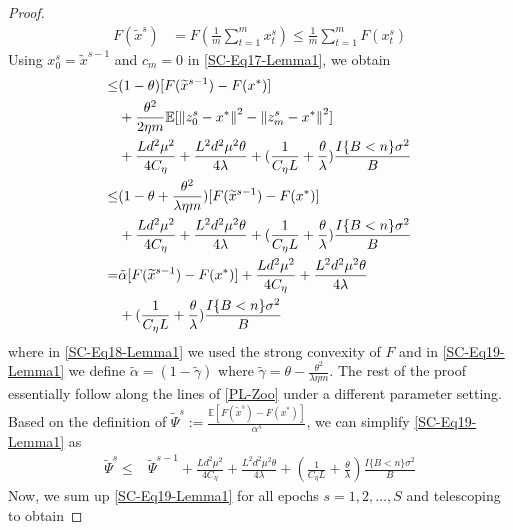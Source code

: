 \documentclass{article}
\newcommand*{\E}{\mathbb{E}}
\newcommand{\norm}[1]{\left\lVert#1\right\rVert}
\theoremstyle{definition}
\theoremstyle{remark}
\begin{document}
{{\begin{proof}
\begin{equation}
\begin{split}
F(\widetilde{x}^s) &= F(\frac{1}{m}\sum_{t=1}^{m} x_{t}^s)\leq \frac{1}{m}\sum_{t=1}^{m}F(x_{t}^s)
\end{split}
\end{equation}
Using $x_0^s = \widetilde{x}^{s-1}$ and $c_m=0$ in \eqref{SC-Eq17-Lemma1}, we obtain
\begin{align}
[F(\widetilde{x}^{s})-F(x^*)] \leq &(1-\theta)[F(\widetilde{x}^{s-1})-F(x^*)]\notag \\
&+ {\frac{ \theta^2}{2\eta m}}\E[\norm{z_{0}^s-x^*}^2-\norm{z_{m}^s-x^*}^2]\notag\\
&+\frac{Ld^2\mu^2}{4C_{\eta}}+\frac{ L^2d^2\mu^2\theta}{4\lambda}+(\frac{1}{C_{\eta} L}+\frac{\theta}{\lambda})\frac{I\{B < n\} \sigma ^2}{B}\notag\\
\leq&(1-\theta+\frac{ \theta^2}{\lambda\eta m})[F(\widetilde{x}^{s-1})-F(x^*)] \notag\\
&+\frac{Ld^2\mu^2}{4C_{\eta}}+\frac{ L^2d^2\mu^2\theta}{4\lambda}+(\frac{1}{C_{\eta} L}+\frac{\theta}{\lambda})\frac{I\{B < n\} \sigma ^2}{B}\label{SC-Eq18-Lemma1}\\
=&\tilde{\alpha}[F(\widetilde{x}^{s-1})-F(x^*)] +\frac{Ld^2\mu^2}{4C_{\eta}}+\frac{ L^2d^2\mu^2\theta}{4\lambda}\notag\\
&+(\frac{1}{C_{\eta} L}+\frac{\theta}{\lambda})\frac{I\{B < n\} \sigma ^2}{B}\label{SC-Eq19-Lemma1}
\end{align}
where in \eqref{SC-Eq18-Lemma1} we used the strong convexity of $F$ and in \eqref{SC-Eq19-Lemma1} we define $\tilde{\alpha} = (1-\widetilde{\gamma})$ where $\widetilde{\gamma}  = \theta - \frac{ \theta^2}{\lambda\eta m}$. The rest of the proof essentially follow along the lines of \ref{PL-Zoo} under a different parameter setting. Based on the definition of $\widetilde{\Psi}^s := \frac{\E[F(\tilde{x}^s)-F(x^*)]}{{\alpha}^s}$, we can simplify \eqref{SC-Eq19-Lemma1} as
\begin{equation}\label{SC-Eq19-1-Lemma1}
\begin{split}
\widetilde{\Psi}^s \leq& \widetilde{\Psi}^{s-1} + \frac{Ld^2\mu^2}{4C_{\eta}}+\frac{ L^2d^2\mu^2\theta}{4\lambda}+(\frac{1}{C_{\eta} L}+\frac{\theta}{\lambda})\frac{I\{B < n\} \sigma ^2}{B}
\end{split}
\end{equation}
Now, we sum up \eqref{SC-Eq19-Lemma1} for all epochs $s=1, 2,\ldots, S$ and telescoping to obtain


\end{proof}}}
\end{document}
